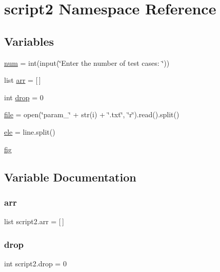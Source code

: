 \hypertarget{namespacescript2}{}\section{script2 Namespace Reference}
\label{namespacescript2}
\subsection*{Variables}
\begin{DoxyCompactItemize}
\item 
\hyperlink{namespacescript2_a4d0e358cc326deb13af00979a4b354d8}{num} = int(input(\char`\"{}Enter the number of test cases\+: \char`\"{}))
\item 
list \hyperlink{namespacescript2_a3d58551d27898c04c056c28e2cfa7184}{arr} = \mbox{[}$\,$\mbox{]}
\item 
int \hyperlink{namespacescript2_aa323ac97fd70045a604fcc33935de8f8}{drop} = 0
\item 
\hyperlink{namespacescript2_a01b4abff0d1a04692461f7309f242afd}{file} = open(\char`\"{}param\+\_\+\char`\"{} + str(i) + \char`\"{}.txt\char`\"{}, \char`\"{}r\char`\"{}).read().split()
\item 
\hyperlink{namespacescript2_adb4ccec0b31df97301835925fae0ec8a}{ele} = line.\+split()
\item 
\hyperlink{namespacescript2_a7cda007e1b2a324fb0dcbcd6ff394b24}{fig}
\end{DoxyCompactItemize}


\subsection{Variable Documentation}
\mbox{\label{namespacescript2_a3d58551d27898c04c056c28e2cfa7184}} 
\subsubsection{\texorpdfstring{arr}{arr}}
{\footnotesize\ttfamily list script2.\+arr = \mbox{[}$\,$\mbox{]}}

\mbox{\label{namespacescript2_aa323ac97fd70045a604fcc33935de8f8}} 
\subsubsection{\texorpdfstring{drop}{drop}}
{\footnotesize\ttfamily int script2.\+drop = 0}

